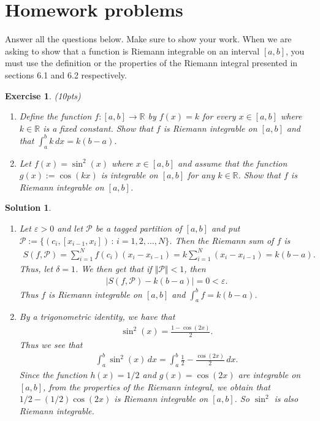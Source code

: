 \documentclass[12pt]{article}
\newcommand{\bR}{\mathbb{R}}
\newcommand{\cP}{\mathcal{P}}
\newcommand{\ra}{\rightarrow}
\theoremstyle{plain}
\newtheorem{exer}{\textbf{Exercise}}}
\theoremstyle{plain}
\newtheorem*{sol}{\textbf{Solution}}}
\theoremstyle{plain}
\theoremstyle{plain}
\begin{document}
\section{Homework problems}
Answer all the questions below. Make sure to show your work. When we are asking to show that a function is Riemann integrable on an interval $[a, b]$, you must use the definition or the properties of the Riemann integral presented in sections 6.1 and 6.2 respectively.

\begin{exer}
(10pts)
\begin{enumerate}[label=\textbf{\alph*)}]
\item Define the function $f : [a, b] \ra \bR$ by $f(x) = k$ for every $x \in [a, b]$ where $k \in \bR$ is a fixed constant. Show that $f$ is Riemann integrable on $[a, b]$ and that $\int_a^b k \, dx = k ( b-a)$.
\item Let $f(x) = \sin^2 (x)$ where $x \in [a, b]$ and assume that the function $g(x) := \cos (kx )$ is integrable on $[a, b]$ for any $k \in \bR$. Show that $f$ is Riemann integrable on $[a, b]$.
\end{enumerate}
\end{exer}
\begin{sol}
\begin{enumerate}[label=\textbf{\alph*)}]
\item Let $\varepsilon > 0$ and let $\cP$ be a tagged partition of $[a, b]$ and put $\cP := \{ (c_i , [x_{i - 1}, x_i] ) \, : \, i = 1 , 2, \ldots , N \}$. Then the Riemann sum of $f$ is
	\begin{align*}
	S (f, \cP ) = \sum_{i = 1}^N f(c_i) (x_i - x_{i-1}) = k \sum_{i = 1}^N (x_i - x_{i - 1}) = k (b - a) .
	\end{align*}
Thus, let $\delta = 1$. We then get that if $\Vert \cP \Vert < 1$, then
	\begin{align*}
	| S (f , \cP ) - k (b - a)| = 0 < \varepsilon .
	\end{align*}
Thus $f$ is Riemann integrable on $[a, b]$ and $\int_a^b f = k (b - a)$.
\item By a trigonometric identity, we have that
	\begin{align*}
	\sin^2 (x) = \frac{1 - \cos (2x)}{2} .
	\end{align*}
Thus we see that
	\begin{align*}
	\int_a^b \sin^2 (x) \, dx = \int_a^b \frac{1}{2} - \frac{\cos (2x )}{2} \, dx .
	\end{align*}
Since the function $h(x) = 1/2$ and $g(x) = \cos (2x)$ are integrable on $[a, b]$, from the properties of the Riemann integral, we obtain that $1/2 - (1/2)\cos (2x )$ is Riemann integrable on $[a, b]$. So $\sin^2$ is also Riemann integrable.
\end{enumerate}
\end{sol}
\end{document}
